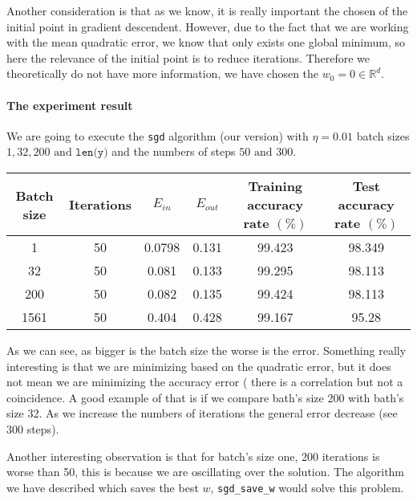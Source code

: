     Another consideration is that as we know, it is really important the chosen of the initial point in gradient descendent. However, due to the fact that we are working with the mean quadratic error, we know that only exists  one global minimum, so here the relevance of the initial point is to reduce iterations. Therefore we theoretically do not have more information,  we have chosen the $w_0 = 0 \in \mathbb R^d.$


    \paragraph{The experiment result}  We are going to execute the \texttt{sgd} algorithm (our version)  with $\eta = 0.01$ batch sizes $1,32, 200 \text{ and } \texttt{len(y)}$ and the numbers of steps $50 \text{ and } 300$.


   


\begin{table}[H]
\begin{tabular}{|c|c|c|c|c|c|}
\hline
   Batch size &  Iterations & $E_{in}$      & $E_{out}$                  & Training accuracy rate $(\%)$   & Test accuracy rate $(\%)$   \\ \hline
  1          &     50     &     0.0798    & 0.131                      &        99.423           & 98.349    \\ \hline
 32          &     50     &   0.081       &      0.133                 & 99.295            &   98.113       \\ \hline
200          &         50 &     0.082     &    0.135                   &      99.424          & 98.113       \\ \hline
 1561        & 50         & 0.404         &  0.428                      &   99.167        & 95.28            \\ \hline              
\end{tabular}
\end{table}


As we can see, as bigger is the batch size the worse is the error.
Something really interesting is that we are minimizing based on the quadratic error, but it does not mean we are minimizing the accuracy error ( there is a correlation but not a coincidence. A good example of that is if we compare bath's size 200 with bath's size 32.  
As we increase the numbers of iterations the general error decrease (see 300 steps). 


Another interesting observation is that for batch's size one,   200 iterations is worse than 50, this is because we are oscillating over the solution. The algorithm we have described which saves the best $w$, \texttt{sgd\_save\_w} would solve this problem. 

